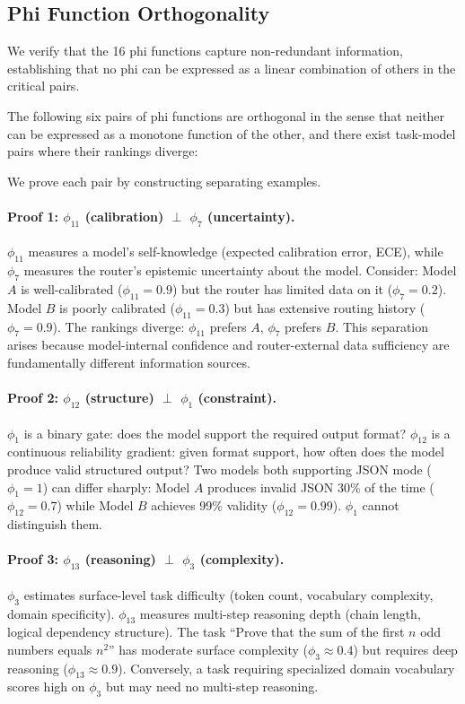 \subsection{Phi Function Orthogonality}

We verify that the 16 phi functions capture non-redundant information, establishing that no phi can be expressed as a linear combination of others in the critical pairs.

\begin{theorem}
\label{thm:orthogonality}
The following six pairs of phi functions are orthogonal in the sense that neither can be expressed as a monotone function of the other, and there exist task-model pairs where their rankings diverge:
\end{theorem}

We prove each pair by constructing separating examples.

\paragraph{Proof 1: $\phi_{11}$ (calibration) $\perp$ $\phi_7$ (uncertainty).}
$\phi_{11}$ measures a model's self-knowledge (expected calibration error, ECE), while $\phi_7$ measures the router's epistemic uncertainty about the model. Consider: Model $A$ is well-calibrated ($\phi_{11} = 0.9$) but the router has limited data on it ($\phi_7 = 0.2$). Model $B$ is poorly calibrated ($\phi_{11} = 0.3$) but has extensive routing history ($\phi_7 = 0.9$). The rankings diverge: $\phi_{11}$ prefers $A$, $\phi_7$ prefers $B$. This separation arises because model-internal confidence and router-external data sufficiency are fundamentally different information sources.

\paragraph{Proof 2: $\phi_{12}$ (structure) $\perp$ $\phi_1$ (constraint).}
$\phi_1$ is a binary gate: does the model support the required output format? $\phi_{12}$ is a continuous reliability gradient: given format support, how often does the model produce valid structured output? Two models both supporting JSON mode ($\phi_1 = 1$) can differ sharply: Model $A$ produces invalid JSON 30\% of the time ($\phi_{12} = 0.7$) while Model $B$ achieves 99\% validity ($\phi_{12} = 0.99$). $\phi_1$ cannot distinguish them.

\paragraph{Proof 3: $\phi_{13}$ (reasoning) $\perp$ $\phi_3$ (complexity).}
$\phi_3$ estimates surface-level task difficulty (token count, vocabulary complexity, domain specificity). $\phi_{13}$ measures multi-step reasoning depth (chain length, logical dependency structure). The task ``Prove that the sum of the first $n$ odd numbers equals $n^2$'' has moderate surface complexity ($\phi_3 \approx 0.4$) but requires deep reasoning ($\phi_{13} \approx 0.9$). Conversely, a task requiring specialized domain vocabulary scores high on $\phi_3$ but may need no multi-step reasoning.

